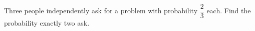 Three people independently ask for a problem with probability $\dfrac{2}{3}$ each. Find the probability exactly two ask.
